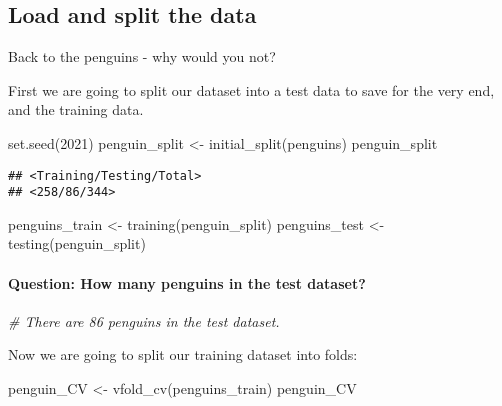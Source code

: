 \documentclass[
]{article}
\newenvironment{Shaded}{\begin{snugshade}}{\end{snugshade}}
\newcommand{\CommentTok}[1]{\textcolor[rgb]{0.56,0.35,0.01}{\textit{#1}}}
\newcommand{\DecValTok}[1]{\textcolor[rgb]{0.00,0.00,0.81}{#1}}
\newcommand{\FunctionTok}[1]{\textcolor[rgb]{0.00,0.00,0.00}{#1}}
\newcommand{\NormalTok}[1]{#1}
\newcommand{\OtherTok}[1]{\textcolor[rgb]{0.56,0.35,0.01}{#1}}
\begin{document}
\hypertarget{load-and-split-the-data}{%
\subsection{Load and split the data}\label{load-and-split-the-data}}

Back to the penguins - why would you not?

First we are going to split our dataset into a test data to save for the
very end, and the training data.

\begin{Shaded}
\begin{Highlighting}[]
\FunctionTok{set.seed}\NormalTok{(}\DecValTok{2021}\NormalTok{) }
\NormalTok{penguin\_split }\OtherTok{\textless{}{-}} \FunctionTok{initial\_split}\NormalTok{(penguins) }
\NormalTok{penguin\_split}
\end{Highlighting}
\end{Shaded}

\begin{verbatim}
## <Training/Testing/Total>
## <258/86/344>
\end{verbatim}

\begin{Shaded}
\begin{Highlighting}[]
\NormalTok{penguins\_train }\OtherTok{\textless{}{-}} \FunctionTok{training}\NormalTok{(penguin\_split) }
\NormalTok{penguins\_test }\OtherTok{\textless{}{-}} \FunctionTok{testing}\NormalTok{(penguin\_split)}
\end{Highlighting}
\end{Shaded}

\hypertarget{question-how-many-penguins-in-the-test-dataset}{%
\paragraph{Question: How many penguins in the test
dataset?}\label{question-how-many-penguins-in-the-test-dataset}}

\begin{Shaded}
\begin{Highlighting}[]
\CommentTok{\# There are 86 penguins in the test dataset.}
\end{Highlighting}
\end{Shaded}

Now we are going to split our training dataset into folds:

\begin{Shaded}
\begin{Highlighting}[]
\NormalTok{penguin\_CV }\OtherTok{\textless{}{-}} \FunctionTok{vfold\_cv}\NormalTok{(penguins\_train) }
\NormalTok{penguin\_CV}
\end{Highlighting}
\end{Shaded}
\end{document}
